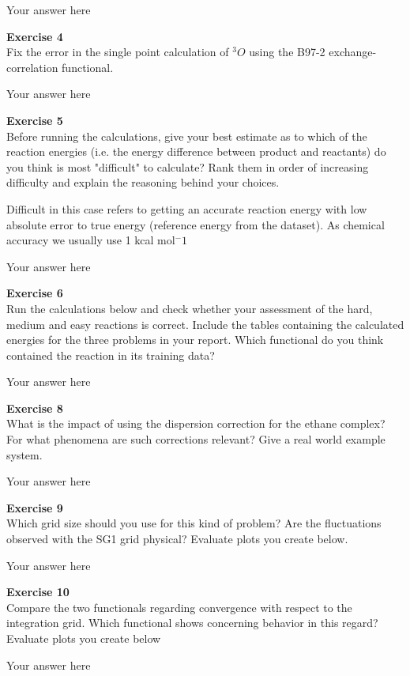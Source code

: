 \documentclass{article}
\begin{document}
Your answer here

\begin{mdframed}
\textbf{Exercise 4}\\
Fix the error in the single point calculation of  $^3 O$ using the B97-2 exchange-correlation functional.
\end{mdframed}

Your answer here

\begin{mdframed}
\textbf{Exercise 5}\\
Before running the calculations, give your best estimate as to which of the reaction energies (i.e. the energy difference between product and reactants) do you think is most "difficult" to calculate? Rank them in order of increasing difficulty and explain the reasoning behind your choices.

Difficult in this case refers to getting an accurate reaction energy with low absolute error to true energy (reference energy from the dataset). As chemical accuracy we usually use 1 kcal mol$^ -1$
\end{mdframed}

Your answer here

\begin{mdframed}
\textbf{Exercise 6}\\
Run the calculations below and check whether your assessment of the hard, medium and easy reactions is correct. Include the tables containing the calculated energies for the three problems in your report. Which functional do you think contained the reaction in its training data?
\end{mdframed}

Your answer here

\begin{mdframed}
\textbf{Exercise 8}\\
What is the impact of using the dispersion correction for the ethane complex? For what phenomena are such corrections relevant? Give a real world example system.
\end{mdframed}

Your answer here

\begin{mdframed}
\textbf{Exercise 9}\\
Which grid size should you use for this kind of problem? Are the fluctuations observed with the SG1 grid physical? Evaluate plots you create below.
\end{mdframed}

Your answer here

\begin{mdframed}
\textbf{Exercise 10}\\
Compare the two functionals regarding convergence with respect to the integration grid. Which functional shows concerning behavior in this regard? Evaluate plots you create below
\end{mdframed}

Your answer here


\clearpage
\end{document}
